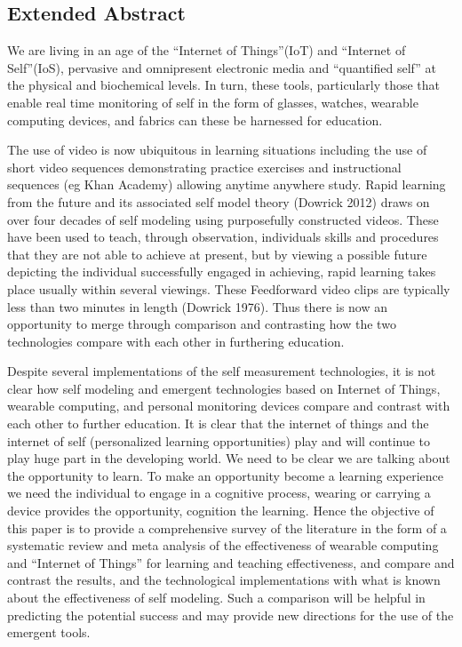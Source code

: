 \subsection{Extended Abstract}


We are living in an age of the “Internet of Things”(IoT) and “Internet of Self”(IoS), pervasive and omnipresent electronic media and “quantified self” at the physical and biochemical levels. In turn, these tools, particularly those that enable real time monitoring of self in the form of glasses, watches, wearable computing devices, and fabrics can these be harnessed for education. 

The use of video is now ubiquitous in learning situations including the use of short video sequences demonstrating practice exercises and instructional sequences (eg Khan Academy) allowing anytime anywhere study. Rapid learning from the future and its associated self model theory (Dowrick 2012) draws on over four decades of self modeling using purposefully constructed videos. These have been used to teach, through observation, individuals skills and procedures that they are not able to achieve at present, but by viewing a possible future depicting the individual successfully engaged in achieving, rapid learning takes place usually within several viewings. These Feedforward video clips are typically less than two minutes in length (Dowrick 1976). Thus there is now an opportunity to merge through comparison and contrasting how the two technologies compare with each other in furthering education.

Despite several implementations of the self measurement technologies, it is not clear how self modeling and emergent technologies based on Internet of Things, wearable computing, and personal monitoring devices compare and contrast with each other to further education. It is clear that the internet of things and the internet of self (personalized learning opportunities) play and will continue to play huge part in the developing world. We need to be clear we are talking about the opportunity to learn. To make an opportunity become a learning experience we need the individual to engage in a cognitive process, wearing or carrying a device provides the opportunity, cognition the learning. Hence the objective of this paper is to provide a comprehensive survey of the literature in the form of a systematic review and meta analysis of the effectiveness of wearable computing and “Internet of Things” for learning and teaching effectiveness, and compare and contrast the results, and the technological implementations with what is known about the effectiveness of self modeling. Such a comparison will be helpful in predicting the potential success and may provide new directions for the use of the emergent tools.

